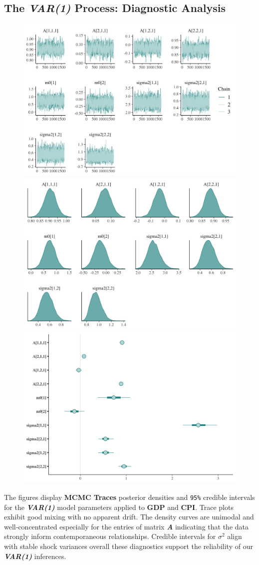 \documentclass{Configuration_Files/PoliMi3i_thesis}
\begin{document}
\subsection{The \textbf{\textit{VAR(1)}} Process: Diagnostic Analysis}
\begin{figure}[H]
    \centering
    \includegraphics[width=0.62\linewidth]{VAR-trace.png}
    \vspace{0.5em}
    
    \includegraphics[width=0.62\linewidth]{VAR-density.png}
    \vspace{0.5em}
    
    \includegraphics[width=0.62\linewidth]{VAR-interval.png}
\end{figure}



The figures display \textbf{MCMC Traces} posterior densities and \texttt{95\%} credible intervals for the \textbf{\textit{VAR(1)}} model parameters applied to \textbf{GDP} and \textbf{CPI}. Trace plots exhibit good mixing with no apparent drift. The density curves are unimodal and well‐concentrated especially for the entries of matrix \textbf{\textit{A}} indicating that the data strongly inform contemporaneous relationships. Credible intervals for
\(\sigma^{2}\) align with stable shock variances overall these diagnostics support the reliability of our \textbf{\textit{VAR(1)}} inferences.
\newpage
\end{document}
